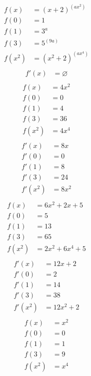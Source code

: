 \begin{align*}
f(x) &= {{\left(x+2\right)}^{\left(a{{x}^{2}}\right)}}\\
f(0) &= 1\\ 
f(1) &= {{3}^{a}}\\ 
f(3) &= {{5}^{\left(9a\right)}}\\ 
f(x^2) &= {{\left({{x}^{2}}+2\right)}^{\left(a{{x}^{4}}\right)}}\\
\end{align*}
\begin{align*}
f'(x) &= \varnothing\\
\end{align*}
\begin{align*}
f(x) &= 4{{x}^{2}}\\
f(0) &= 0\\ 
f(1) &= 4\\ 
f(3) &= 36\\ 
f(x^2) &= 4{{x}^{4}}\\
\end{align*}
\begin{align*}
f'(x) &= 8x\\
f'(0) &= 0\\ 
f'(1) &= 8\\
f'(3) &= 24\\ 
f'(x^2) &= 8{{x}^{2}}\\
\end{align*}
\begin{align*}
f(x) &= 6{{x}^{2}}+2x+5\\
f(0) &= 5\\ 
f(1) &= 13\\ 
f(3) &= 65\\ 
f(x^2) &= 2{{x}^{2}}+6{{x}^{4}}+5\\
\end{align*}
\begin{align*}
f'(x) &= 12x+2\\
f'(0) &= 2\\ 
f'(1) &= 14\\
f'(3) &= 38\\ 
f'(x^2) &= 12{{x}^{2}}+2\\
\end{align*}
\begin{align*}
f(x) &= {{x}^{2}}\\
f(0) &= 0\\ 
f(1) &= 1\\ 
f(3) &= 9\\ 
f(x^2) &= {{x}^{4}}\\
\end{align*}
